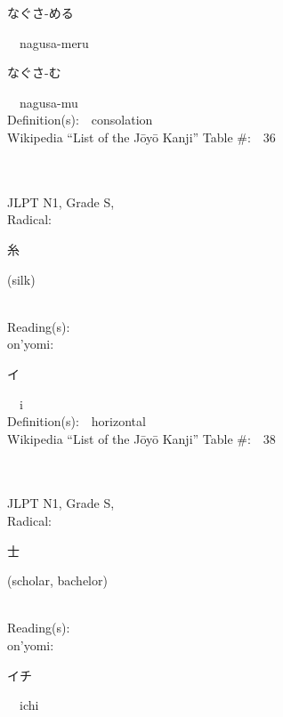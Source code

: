 \begin{multicols}{2}
{\hspace*{2em}}{\begin{CJK}{UTF8}{min} なぐさ-める \end{CJK}}\ \ nagusa-meru\ \ \\
{\hspace*{2em}}{\begin{CJK}{UTF8}{min} なぐさ-む \end{CJK}}\ \ nagusa-mu\ \ \\
Definition(s):\ \ consolation \\
Wikipedia ``List of the J\=oy\=o Kanji'' Table \#:\ \ 36 \\
\ \ \\
{\fontsize{34pt}{40pt}  }\ \ \\
{JLPT N1, Grade S, \\Radical:\ \ {\begin{CJK}{UTF8}{min} 糸 \end{CJK}} (silk) } \\
Reading(s):\ \ \\
{\hspace*{1em}}on'yomi:\ \ \\
{\hspace*{2em}}{\begin{CJK}{UTF8}{min} イ \end{CJK}}\ \ i\ \ \\
Definition(s):\ \ horizontal \\
Wikipedia ``List of the J\=oy\=o Kanji'' Table \#:\ \ 38 \\
\ \ \\
{\fontsize{34pt}{40pt}  }\ \ \\
{JLPT N1, Grade S, \\Radical:\ \ {\begin{CJK}{UTF8}{min} 士 \end{CJK}} (scholar, bachelor) } \\
Reading(s):\ \ \\
{\hspace*{1em}}on'yomi:\ \ \\
{\hspace*{2em}}{\begin{CJK}{UTF8}{min} イチ \end{CJK}}\ \ ichi\ \ \\

\end{multicols}
